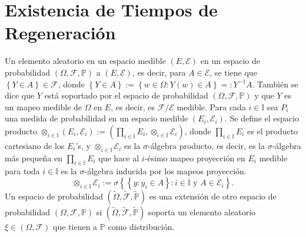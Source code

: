 \documentclass{article}
\newcommand{\prob}{\mathbb{P}}
\begin{document}
%
\section{Existencia de Tiempos de Regeneraci\'on}
%


Un elemento aleatorio en un espacio medible $\left(E,\mathcal{E}\right)$ en un espacio de probabilidad $\left(\Omega,\mathcal{F},\prob\right)$ a $\left(E,\mathcal{E}\right)$, es decir,
para $A\in \mathcal{E}$,  se tiene que $\left\{Y\in A\right\}\in\mathcal{F}$, donde $\left\{Y\in A\right\}:=\left\{w\in\Omega:Y\left(w\right)\in A\right\}=:Y^{-1}A$. Tambi\'en se dice que $Y$ est\'a soportado por el espacio de probabilidad $\left(\Omega,\mathcal{F},\prob\right)$ y que $Y$ es un mapeo medible de $\Omega$ en $E$, es decir, es $\mathcal{F}/\mathcal{E}$ medible. Para cada $i\in \mathbb{I}$ sea $P_{i}$ una medida de probabilidad en un espacio medible $\left(E_{i},\mathcal{E}_{i}\right)$. Se define el espacio producto $\otimes_{i\in\mathbb{I}}\left(E_{i},\mathcal{E}_{i}\right):=\left(\prod_{i\in\mathbb{I}}E_{i},\otimes_{i\in\mathbb{I}}\mathcal{E}_{i}\right)$, donde $\prod_{i\in\mathbb{I}}E_{i}$ es el producto cartesiano de los $E_{i}$'s, y $\otimes_{i\in\mathbb{I}}\mathcal{E}_{i}$ es la $\sigma$-\'algebra producto, es decir, es la $\sigma$-\'algebra m\'as peque\~na en $\prod_{i\in\mathbb{I}}E_{i}$ que hace al $i$-\'esimo mapeo proyecci\'on en $E_{i}$ medible para toda $i\in\mathbb{I}$ es la $\sigma$-\'algebra inducida por los mapeos proyecci\'on. $$\otimes_{i\in\mathbb{I}}\mathcal{E}_{i}:=\sigma\left\{\left\{y:y_{i}\in A\right\}:i\in\mathbb{I}\textrm{ y }A\in\mathcal{E}_{i}\right\}.$$ Un espacio de probabilidad $\left(\tilde{\Omega},\tilde{\mathcal{F}},\tilde{\prob}\right)$ es una extensi\'on de otro espacio de probabilidad $\left(\Omega,\mathcal{F},\prob\right)$ si $\left(\tilde{\Omega},\tilde{\mathcal{F}},\tilde{\prob}\right)$ soporta un elemento aleatorio $\xi\in\left(\Omega,\mathcal{F}\right)$ que tienen a $\prob$ como distribuci\'on.
\end{document}
